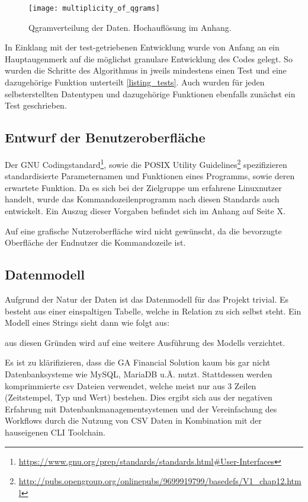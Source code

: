 \begin{figure}[!htp]
	\label{qgram_verteilung_klein}
	\caption{Qgramverteilung der Daten. Hochauflösung im Anhang.}
	\texttt{[image: multiplicity\_of\_qgrams]}
\end{figure}

In Einklang mit der test-getriebenen Entwicklung wurde von Anfang an ein Hauptaugenmerk
auf die möglichst granulare Entwicklung des Codes gelegt. So wurden die Schritte
des Algorithmus in jweils mindestens einen Test und eine dazugehörige Funktion unterteilt \ref{listing_tests}.
Auch wurden für jeden selbsterstellten Datentypen und dazugehörige Funktionen
ebenfalls zunächst ein Test geschrieben.



\subsection{Entwurf der Benutzeroberfläche}
Der GNU Codingstandard\footnote{\url{https://www.gnu.org/prep/standards/standards.html\#User-Interfaces}},
sowie die POSIX Utility Guidelines\footnote{\url{http://pubs.opengroup.org/onlinepubs/9699919799/basedefs/V1_chap12.html}}
spezifizieren standardisierte Parameternamen und Funktionen eines Programms, sowie
deren erwartete Funktion. Da es sich bei der Zielgruppe um erfahrene Linuxnutzer handelt, wurde das
Kommandozeilenprogramm nach diesen Standards auch entwickelt. Ein Auszug dieser
Vorgaben befindet sich im Anhang auf Seite X.\par

Auf eine grafische Nutzeroberfläche wird nicht gewünscht, da die bevorzugte
Oberfläche der Endnutzer die Kommandozeile ist.

\subsection{Datenmodell}
Aufgrund der Natur der Daten ist das Datenmodell für das Projekt trivial. Es besteht aus einer
einspaltigen Tabelle, welche in Relation zu sich selbst steht. Ein Modell eines Strings sieht dann wie folgt aus:

aus diesen Gründen wird auf eine weitere Ausführung des Modells verzichtet.

Es ist zu klärifizieren, dass die GA Financial Solution kaum bis gar nicht Datenbanksysteme wie
MySQL, MariaDB u.Ä. nutzt. Stattdessen werden komprimmierte csv Dateien verwendet, welche
meist nur aus 3 Zeilen (Zeitstempel, Typ und Wert) bestehen. Dies ergibt sich aus
der negativen Erfahrung mit Datenbankmanagementsystemen und der Vereinfachung des Workflows durch
die Nutzung von CSV Daten in Kombination mit der hauseigenen CLI Toolchain.


